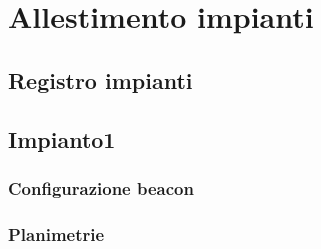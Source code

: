 \documentclass[../Sperimentazioni.tex]{subfiles}
\begin{document}
\section{Allestimento impianti}
\label{sec:AllestimentoImpianto}

	\subsection{Registro impianti}
	
	
	\subsection{Impianto1}
		
		\subsubsection{Configurazione beacon}		
		
		\subsubsection{Planimetrie}
		
	
\end{document}
